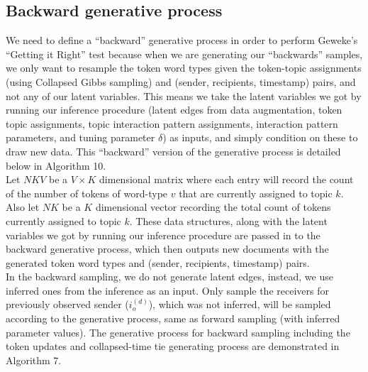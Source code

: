\documentclass[a4paper]{article}
\begin{document}
       \subsection{Backward generative process} \label{subsubsec: Backward Generative Process}
   We need to define a “backward” generative process in order to perform Geweke’s “Getting it Right” test \citep{geweke2004getting} because when we are generating our “backwards” samples, we only want to resample the token word types given the token-topic assignments (using Collapsed Gibbs sampling) and (sender, recipients, timestamp) pairs, and not any of
   our latent variables. This means we take the latent variables we got by running our inference procedure (latent edges from data augmentation, token topic assignments, topic interaction pattern assignments, interaction pattern parameters, and tuning parameter $\delta$) as inputs, and simply condition on these to draw new data. This “backward” version of the generative process is detailed below in Algorithm 10.\\ \newline
   Let $NKV$ be a $V\times K$ dimensional matrix where each entry will record the count of the number of tokens of word-type $v$ that are currently assigned to topic $k$. Also let $NK$ be a $K$ dimensional vector recording the total count of tokens currently assigned to topic $k$. These
   data structures, along with the latent variables we got by running our inference procedure are passed in to the backward generative process, which then outputs new documents with the generated token word types and (sender, recipients, timestamp) pairs. \\\newline
In the backward sampling, we do not generate latent edges, instead, we use inferred ones from the inference as an input. Only sample the receivers for previously observed sender ($i_o^{(d)}$), which was not inferred, will be sampled according to the generative process, same as forward sampling (with inferred parameter values). The generative process for backward sampling including the token updates and collapsed-time tie generating process are demonstrated in Algorithm 7.
\end{document}
